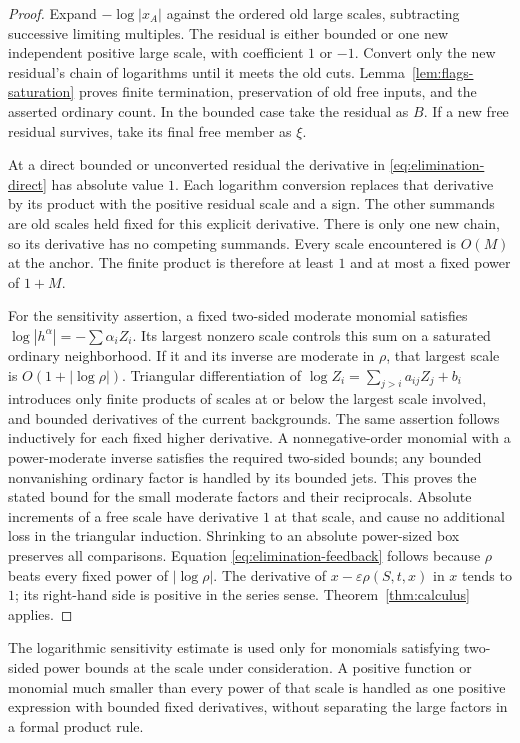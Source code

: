 \begin{proof}
Expand $-\log|x_A|$ against the ordered old large scales, subtracting
successive limiting multiples.  The residual is either bounded or one
new independent positive large scale, with coefficient $1$ or $-1$.
Convert only the new residual's chain of logarithms until it meets the
old cuts.  Lemma~\ref{lem:flags-saturation} proves finite termination,
preservation of old free inputs, and the asserted ordinary count.  In
the bounded case take the residual as $B$.  If a new free residual
survives, take its final free member as $\xi$.

At a direct bounded or unconverted residual the derivative in
\eqref{eq:elimination-direct} has absolute value $1$.  Each logarithm
conversion replaces that derivative by its product with the positive
residual scale and a sign.  The other summands are old scales held fixed
for this explicit derivative.  There is only one new chain, so its
derivative has no competing summands.  Every scale encountered is
$O(M)$ at the anchor.  The finite product is therefore at least $1$
and at most a fixed power of $1+M$.

For the sensitivity assertion, a fixed two-sided moderate monomial satisfies
$\log|h^\alpha|=-\sum\alpha_iZ_i$.  Its largest nonzero scale controls
this sum on a saturated ordinary neighborhood.  If it and its inverse
are moderate in $\rho$, that largest scale is $O(1+|\log\rho|)$.
Triangular differentiation of
$\log Z_i=\sum_{j>i}a_{ij}Z_j+b_i$ introduces only finite products of
scales at or below the largest scale involved, and bounded derivatives
of the current backgrounds.  The same assertion follows inductively
for each fixed higher derivative.  A nonnegative-order monomial with
a power-moderate inverse satisfies the required two-sided bounds;
any bounded nonvanishing ordinary factor is handled by its bounded
jets.  This proves the stated bound for the small moderate factors
and their reciprocals.  Absolute
increments of a free scale have derivative $1$ at that scale, and cause
no additional loss in the triangular induction.  Shrinking to an
absolute power-sized box preserves all comparisons.  Equation
\eqref{eq:elimination-feedback} follows because $\rho$ beats every
fixed power of $|\log\rho|$.  The derivative of
$x-\varepsilon\rho(S,t,x)$ in $x$ tends to $1$; its right-hand side is
positive in the series sense.  Theorem~\ref{thm:calculus} applies.
\end{proof}

The logarithmic sensitivity estimate is used only for monomials
satisfying two-sided power bounds at the scale under consideration.  A positive function or
monomial much smaller than every power of that scale is handled as one
positive expression with bounded fixed derivatives, without separating
the large factors in a formal product rule.

